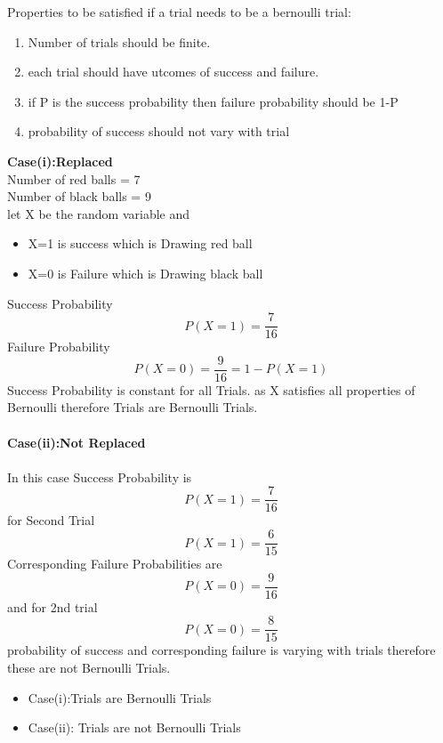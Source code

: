 Properties to be satisfied if a trial needs to be a bernoulli trial:\\
\begin{enumerate}
    \item Number of trials should be finite.
    \item each trial should have utcomes of success and failure.\
    \item if P is the success probability then failure probability should be 1-P
    \item probability of success should not vary with trial
\end{enumerate}

\textbf{Case(i):Replaced} \\ 
Number of red balls = 7\\
Number of black balls = 9\\
let X be the random variable and 
\begin{itemize}
    \item X=1 is success which is Drawing red ball
    \item X=0 is Failure which is Drawing black ball
\end{itemize}
Success Probability 
\begin{equation}
    P(X=1) = \frac{7}{16} 
\end{equation}
Failure Probability
\begin{equation}
     P(X=0) = \frac{9}{16} = 1-P(X=1)
\end{equation}
 Success Probability is  constant for all Trials.
 as X satisfies all properties of Bernoulli therefore Trials are Bernoulli Trials.\\ \\
\textbf{Case(ii):Not Replaced} \\ \\
In this case Success Probability is 
\begin{equation}
    P(X=1) =\frac{7}{16}
\end{equation}
 for Second Trial 
\begin{equation}
     P(X=1) = \frac{6}{15} 
\end{equation} 
 Corresponding Failure Probabilities are 
 \begin{equation}
     P(X=0) = \frac{9}{16}
 \end{equation} and for 2nd trial 
 \begin{equation}
     P(X=0) = \frac{8}{15}
 \end{equation}  
  probability of success and corresponding failure is varying with trials therefore these are not Bernoulli Trials. 
\begin{itemize}
    \item Case(i):Trials are Bernoulli Trials 
    \item Case(ii): Trials are not Bernoulli Trials
\end{itemize}